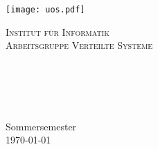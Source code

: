 %
%
%
%
%
%

\begin{titlepage}
	\centering
	\thispagestyle{empty}
	\begin{center}
	\texttt{[image: uos.pdf]}
	\end{center}
	\LARGE{\textsc{Institut für Informatik\\Arbeitsgruppe Verteilte Systeme}}
	\vfill
	\HRule\\[0.4cm]
	\LARGE{\emph{\mycourse}}\\
	\vspace{8mm}
	\huge{\textbf{{\selectfont
	\myMaintitle}}}\\
	\HRule\\[0.4cm]
	\vspace{9mm}
	\LARGE{\myName}\\
	\vspace{0.2cm}
	\normalsize{\myMatrikel}\\
	\vspace{4cm}
	\large{Sommersemester}\\
	\vspace{0.2cm}
	\large{\today}
	\vfill
	\end{titlepage}
	\newpage
